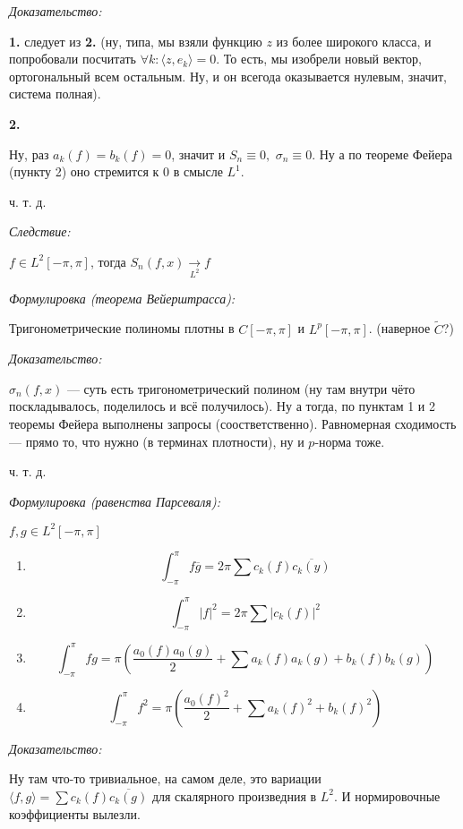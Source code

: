 \documentclass{article}
\def\dbl{\,\,}
\def\goesto#1{\underset{#1}{\longrightarrow}}
\def\sk#1#2{\langle #1, #2 \rangle}
\begin{document}
\textit{Доказательство:}

\textbf{1.} следует из \textbf{2.} (ну, типа, мы взяли функцию $z$ из более широкого класса, и попробовали посчитать $\forall k: \sk{z}{e_k} = 0$. То есть, мы изобрели новый вектор, ортогональный всем остальным. Ну, и он всегода оказывается нулевым, значит, система полная).

\textbf{2.}

Ну, раз $a_k(f) = b_k(f) = 0$, значит и $S_n \equiv 0, \dbl \sigma_n \equiv 0$. Ну а по теореме Фейера (пункту 2) оно стремится к $0$ в смысле $L^1$. 

ч. т. д. 

\textit{Следствие: }

$f \in L^2[-\pi, \pi]$, тогда $S_n(f, x) \goesto{L^2} f$

\textit{Формулировка (теорема Вейерштрасса):}

Тригонометрические полиномы плотны в $C[-\pi, \pi]$ и $L^p[-\pi, \pi]$. (наверное $\tilde{C}$?)

\textit{Доказательство:}

$\sigma_n(f, x)$ --- суть есть тригонометрический полином (ну там внутри чёто поскладывалось, поделилось и всё получилось). Ну а тогда, по пунктам 1 и 2 теоремы Фейера выполнены запросы (соостветственно). Равномерная сходимость --- прямо то, что нужно (в терминах плотности), ну и $p$-норма тоже.

ч. т. д. 

\textit{Формулировка (равенства Парсеваля):}

$f, g \in L^2[-\pi, \pi]$

\begin{enumerate}
    \item \[\int_{-\pi}^{\pi} f \overline{g} = 2\pi \sum c_k(f) \overline{c_k(y)}\]
    \item \[\int_{-\pi}^{\pi} |f|^2 = 2\pi \sum |c_k(f)|^2\]
    \item \[\int_{-\pi}^{\pi} fg = \pi \left(\frac{a_0(f)a_0(g)}{2} + \sum a_k(f)a_k(g) + b_k(f)b_k(g)\right)\]
    \item \[\int_{-\pi}^{\pi} f^2 = \pi \left( \frac{a_0(f)^2}{2} + \sum a_k(f)^2 + b_k(f)^2 \right)\]
\end{enumerate}

\textit{Доказательство:}

Ну там что-то тривиальное, на самом деле, это вариации $\sk{f}{g} = \sum c_k(f) \overline{c_k(g)}$ для скалярного произведния в $L^2$. И нормировочные коэффициенты вылезли.
\end{document}
